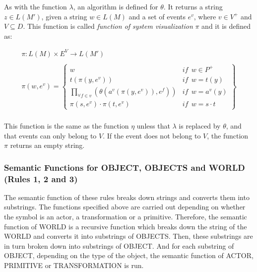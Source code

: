\documentclass[10pt,journal,letterpaper,compsoc]{IEEEtran}
\begin{document}
As with the function $\lambda$, an algorithm is defined for $\theta$. It returns a string $z \in
L(M')$, given a string $w \in L(M)$ and a set of events $e^v$, where $v \in V^+$ and $V \subseteq
D$. This function is called \textit{function of system visualization} $\pi$ and it is defined as:


\begin{equation}
   \begin{array}{c}
    \pi: L(M) \times E^V \rightarrow L(M') \\
\\
    \pi (w, e^v) = \left\{
    \begin{array}{ll}
        w   & \mathit{if}  \ \ w \in P^+  \\

        t(\pi (y, e^v))     & \mathit{if}  \ \  w = t(y)  \\

        \underset{\forall f \in v}{ \prod }(\theta (a^v (\pi
            (y, e^v)), e^f))    & \mathit{if}  \ \ w = a^v(y)
\\

        \pi (s, e^v) \cdot \pi (t, e^v)    & \mathit{if}  \
\  w = s \cdot t
    \end{array}\right\} \\
   \end{array}
\end{equation}


This function is the same as the function $\eta$ unless that $\lambda$ is
replaced by $\theta$, and that events can only belong to $V$. If the event does
not belong to $V$, the function $\pi$ returns an empty string.





\subsubsection{Semantic Functions for OBJECT, OBJECTS and WORLD (Rules 1,
2 and 3)
\label{sec:rules123}}

The semantic function of these rules breaks down strings and converts them into substrings. The
functions specified above are carried out depending on whether the symbol is an actor, a
transformation or a primitive. Therefore, the semantic function of WORLD is a recursive function
which breaks down the string of the WORLD and converts it into substrings of OBJECTS. Then, these
substrings are in turn broken down into substrings of OBJECT. And for each substring of OBJECT,
depending on the type of the object, the semantic function of ACTOR, PRIMITIVE or TRANSFORMATION is
run.
\end{document}
